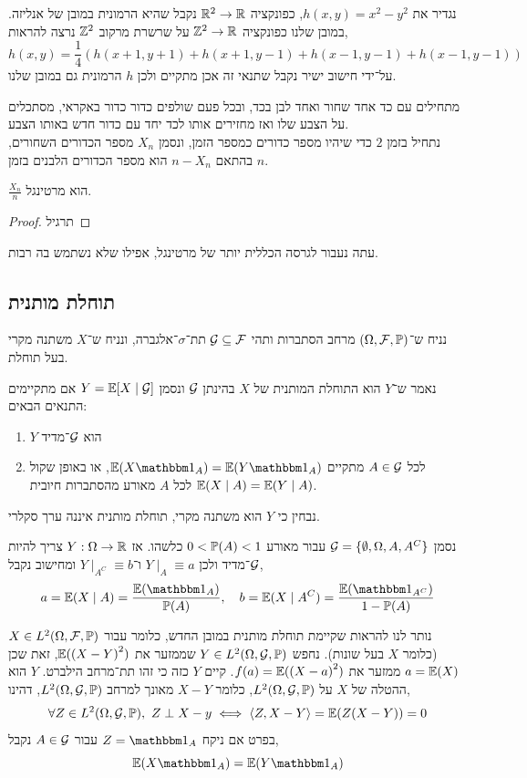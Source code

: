 \begin{example}
	נגדיר את $h(x, y) = x^2 - y^2$, כפונקציה $\mathbb{R}^2 \to \mathbb{R}$ נקבל שהיא הרמונית במובן של אנליזה.
	במובן שלנו כפונקציה $\mathbb{Z}^2 \to \mathbb{R}$ על שרשרת מרקוב $\mathbb{Z}^2$ נרצה להראות,
	\[
		h(x, y)
		= \frac{1}{4} (h(x + 1, y + 1) + h(x + 1, y - 1) + h(x - 1, y - 1) + h(x - 1, y - 1))
	\]
	על־ידי חישוב ישיר נקבל שתנאי זה אכן מתקיים ולכן $h$ הרמונית גם במובן שלנו.
\end{example}
\begin{example}
	מתחילים עם כד אחד שחור ואחד לבן בכד, ובכל פעם שולפים כדור כדור באקראי, מסתכלים על הצבע שלו ואז מחזירים אותו לכד יחד עם כדור חדש באותו הצבע. \\
	נתחיל בזמן $2$ כדי שיהיו מספר כדורים כמספר הזמן, ונסמן $X_n$ מספר הכדורים השחורים, בהתאם $n - X_n$ הוא מספר הכדורים הלבנים בזמן $n$.
\end{example}
\begin{proposition}
	$\frac{X_n}{n}$ הוא מרטינגל.
\end{proposition}
\begin{proof}
	תרגיל
\end{proof}
עתה נעבור לגרסה הכללית יותר של מרטינגל, אפילו שלא נשתמש בה רבות.

\subsection{תוחלת מותנית}
נניח ש־$(\Omega, \mathcal{F}, \mathbb{P})$ מרחב הסתברות ותהי $\mathcal{G} \subseteq \mathcal{F}$ תת־$\sigma$־אלגברה, ונניח ש־$X$ משתנה מקרי בעל תוחלת.
\begin{definition}
	נאמר ש־$Y$ הוא התוחלת המותנית של $X$ בהינתן $\mathcal{G}$ ונסמן $Y = \mathbb{E}[X \mid \mathcal{G}]$ אם מתקיימים התנאים הבאים:
	\begin{enumerate}
		\item $Y$ הוא $\mathcal{G}$־מדיד
		\item לכל $A \in \mathcal{G}$ מתקיים $\EE(X \indicator_A) = \EE(Y \indicator_A)$, או באופן שקול $\mathbb{E}(X \mid A) = \mathbb{E}(Y \mid A)$ לכל $A$ מאורע מהסתברות חיובית.
	\end{enumerate}
\end{definition}
נבחין כי $Y$ הוא משתנה מקרי, תוחלת מותנית איננה ערך סקלרי.
\begin{example}
	נסמן $\mathcal{G} = \{\emptyset, \Omega, A, A^C \}$ עבור מאורע $0 < \mathbb{P}(A) < 1$ כלשהו.
	אז $Y : \Omega \to \mathbb{R}$ צריך להיות $\mathcal{G}$־מדיד ולכן $Y \mid_A \equiv a$ ו־$Y \mid_{A^C} \equiv b$ ומחישוב נקבל,
	\[
		a = \EE(X \mid A) = \frac{\EE( \indicator_A)}{\PP(A)},
		\quad
		b = \EE(X \mid A^C) = \frac{\EE( \indicator_{A^C})}{1 - \PP(A)}
	\]
\end{example}
נותר לנו להראות שקיימת תוחלת מותנית במובן החדש, כלומר עבור $X \in L^2(\Omega, \mathcal{F}, \mathbb{P})$ (כלומר $X$ בעל שונות).
נחפש $Y \in L^2(\Omega, \mathcal{G}, \mathbb{P})$ שממזער את $\mathbb{E}({(X - Y)}^2)$, זאת שכן $a = \mathbb{E}(X)$ ממזער את $f(a) = \mathbb{E}({(X - a)}^2)$.
קיים $Y$ כזה כי זהו תת־מרחב הילברט.
$Y$ הוא ההטלה של $X$ על $L^2(\Omega, \mathcal{G}, \mathbb{P})$, כלומר $X - Y$ מאונך למרחב $L^2(\Omega, \mathcal{G}, \mathbb{P})$, דהינו,
\[
	\forall Z \in L^2(\Omega, \Gg, \PP),\ 
	Z \perp X - y
	\iff \langle Z, X - Y \rangle
	= \EE(Z(X - Y))
	= 0
\]
בפרט אם ניקח $Z = \indicator_A$ עבור $A \in \mathcal{G}$ נקבל,
\[
	\EE(X \indicator_A)
	= \EE(Y \indicator_A)
\]

